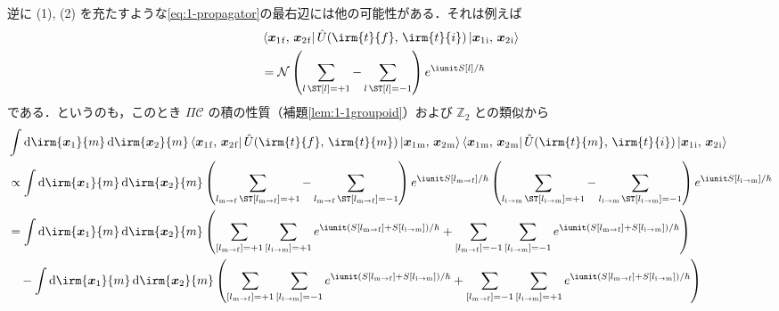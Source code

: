 \documentclass[TQFT_main]{subfiles}
\begin{document}
逆に (1), (2) を充たすような\eqref{eq:1-propagator}の最右辺には他の可能性がある．それは例えば
\begin{align}
    &\bra{\bm{x}_1{}_{\mathrm{f}},\, \bm{x}_2{}_{\mathrm{f}}} \hat{U}(\irm{t}{f},\, \irm{t}{i}) \ket{\bm{x}_1{}_{\mathrm{i}},\, \bm{x}_2{}_{\mathrm{i}}}\\
    &= \mathcal{N} \left( \sum_{l\, \ST [l] = +1} - \sum_{l\, \ST [l] = -1} \right) e^{\iunit S[l]/\hbar} \label{eq:1-propagator-f}
\end{align}
である．というのも，このとき $\Pi\mathcal{C}$ の積の性質（補題\ref{lem:1-1groupoid}）および $\mathbb{Z}_2$ との類似から
\begin{align}
    &\int \dd{\irm{\bm{x}_1}{m}}\dd{\irm{\bm{x}_2}{m}} \bra{\bm{x}_1{}_{\mathrm{f}},\, \bm{x}_2{}_{\mathrm{f}}} \hat{U}(\irm{t}{f},\, \irm{t}{m}) \ket{\bm{x}_1{}_{\mathrm{m}},\, \bm{x}_2{}_{\mathrm{m}}} \bra{\bm{x}_1{}_{\mathrm{m}},\, \bm{x}_2{}_{\mathrm{m}}} \hat{U}(\irm{t}{m},\, \irm{t}{i}) \ket{\bm{x}_1{}_{\mathrm{i}},\, \bm{x}_2{}_{\mathrm{i}}} \\
    &\propto \int \dd{\irm{\bm{x}_1}{m}}\dd{\irm{\bm{x}_2}{m}} \left( \sum_{l_{\mathrm{m} \to \mathrm{f}}\, \ST [l_{\mathrm{m} \to \mathrm{f}}] = +1} - \sum_{l_{\mathrm{m} \to \mathrm{f}}\, \ST [l_{\mathrm{m} \to \mathrm{f}}] = -1} \right) e^{\iunit S[l_{\mathrm{m} \to \mathrm{f}}]/\hbar} \left( \sum_{l_{\mathrm{i} \to \mathrm{m}}\, \ST [l_{\mathrm{i} \to \mathrm{m}}] = +1} - \sum_{l_{\mathrm{i} \to \mathrm{m}}\, \ST [l_{\mathrm{i} \to \mathrm{m}}] = -1} \right) e^{\iunit S[l_{\mathrm{i} \to \mathrm{m}}]/\hbar} \\
    &= 
    \int \dd{\irm{\bm{x}_1}{m}}\dd{\irm{\bm{x}_2}{m}} \left( \sum_{[l_{\mathrm{m} \to \mathrm{f}}] = +1} \sum_{[l_{\mathrm{i} \to \mathrm{m}}] = +1} e^{\iunit (S[l_{\mathrm{m} \to \mathrm{f}}] + S[l_{\mathrm{i} \to \mathrm{m}}]) / \hbar} + \sum_{[l_{\mathrm{m} \to \mathrm{f}}] = -1} \sum_{[l_{\mathrm{i} \to \mathrm{m}}] = -1} e^{\iunit (S[l_{\mathrm{m} \to \mathrm{f}}] + S[l_{\mathrm{i} \to \mathrm{m}}])/\hbar}\right)  \\
    &\quad -\int \dd{\irm{\bm{x}_1}{m}}\dd{\irm{\bm{x}_2}{m}} \left( \sum_{[l_{\mathrm{m} \to \mathrm{f}}] = +1} \sum_{[l_{\mathrm{i} \to \mathrm{m}}] = -1} e^{\iunit (S[l_{\mathrm{m} \to \mathrm{f}}] + S[l_{\mathrm{i} \to \mathrm{m}}]) / \hbar} + \sum_{[l_{\mathrm{m} \to \mathrm{f}}] = -1} \sum_{[l_{\mathrm{i} \to \mathrm{m}}] = +1} e^{\iunit (S[l_{\mathrm{m} \to \mathrm{f}}] + S[l_{\mathrm{i} \to \mathrm{m}}])/\hbar}\right)  \\

\end{align}
\end{document}

